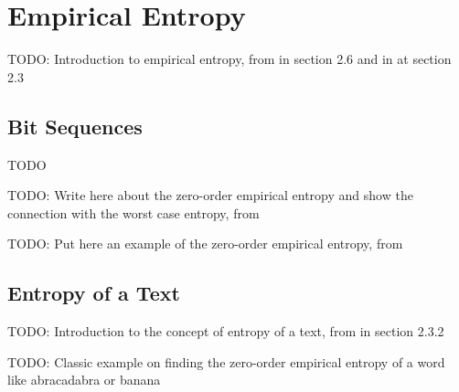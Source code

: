
\section{Empirical Entropy}
TODO: Introduction to empirical entropy, from \cite{han2002mathematics} in section 2.6 and in \cite{navarro2016compact} at section 2.3
\subsection{Bit Sequences}
\begin{definition}
    TODO
\end{definition}
TODO: Write here about the zero-order empirical entropy and show the connection with the worst case entropy, from \cite{navarro2016compact}

\begin{example}
    TODO: Put here an example of the zero-order empirical entropy, from \cite{navarro2016compact}
\end{example}

\subsection{Entropy of a Text}
TODO: Introduction to the concept of entropy of a text, from \cite{navarro2016compact} in section 2.3.2

\begin{example}
    TODO: Classic example on finding the zero-order empirical entropy of a word like abracadabra or banana
\end{example}

\clearpage
